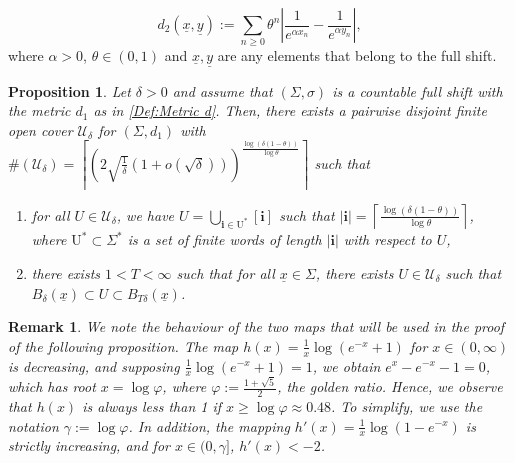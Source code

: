 \documentclass[10pt,a4paper]{amsart}
\newtheorem{proposition}{Proposition}
\newtheorem{remark}{Remark}
\def\U{\ensuremath{\mathcal U}}
\def\st{such that }
\def\ulx{\underline{x}}
\def\uly{\underline{y}}
\begin{document}
\begin{equation}\label{Def:Metric d_2}
    d_2(\ulx,\underline{y}):=\sum_{n\ge 0} \theta^n  \left| \frac{1}{e^{\alpha x_n}} - \frac{1}{e^{\alpha y_n}} \right|,
\end{equation}where $\alpha>0$, $\theta\in(0,1)$ and $\ulx,\uly$ are any elements that belong to the full shift.

\begin{proposition}\label{Lemma:Totally bounded in Full shift}
    Let $\delta>0$ and assume that $(\Sigma,\sigma)$ is a countable full shift with the metric $d_1$ as in \eqref{Def:Metric d}. Then, there exists a pairwise disjoint finite open cover $\U_{\delta}$ for $(\Sigma,d_1)$ with $\#(\U_{\delta})=\left\lceil\left(2\sqrt{\frac{1}{\delta}}\left(1+o\left(\sqrt{\delta}\right)\right)\right) ^ { \frac{\log(\delta(1-\theta))}{\log\theta}}\right\rceil$ \st
\begin{enumerate}
    \item for all $U\in \U_{\delta}$, we have $U=\bigcup_{\mathbf{i}\in \mathrm{U^*}}[\mathbf{i}]$ \st $|\mathbf{i}|= \left\lceil\frac{\log(\delta(1-\theta))}{\log\theta}\right\rceil$, where $\mathrm{U^*}\subset\Sigma^*$ is a set of finite words of length $|\mathbf{i}|$ with respect to $U$,
    \item there exists $1<T<\infty$ \st for all $\ulx\in \Sigma$, there exists $U\in\U_\delta$ \st $B_{\delta}(\ulx)\subset U\subset B_{T\delta}(\ulx)$.
\end{enumerate}
 

    


    
\end{proposition}

\begin{remark}\label{Remark: golden ration}
   We note the behaviour of the two maps that will be used in the proof of the following proposition. The map $h(x)=\frac{1}{x}\log\left(e^{-x}+1\right)$ for $x\in(0,\infty)$ is decreasing, and supposing $ \frac{1}{x}\log\left(e^{-x}+1\right)=1$, we obtain $e^x-e^{-x}-1=0$, which has root $x=\log\varphi$, where $\varphi:=\frac{1+\sqrt{5}}{2}$, the golden ratio. Hence, we observe that $h(x)$ is always less than 1 if $x\ge \log \varphi\approx 0.48$. To simplify, we use the notation $\gamma:=\log \varphi$.
    In addition, the mapping $h'(x)=\frac{1}{x}\log(1-e^{-x})$ is strictly increasing, and for $x\in(0,\gamma]$, $h'(x)<-2$.
\end{remark}
\end{document}
